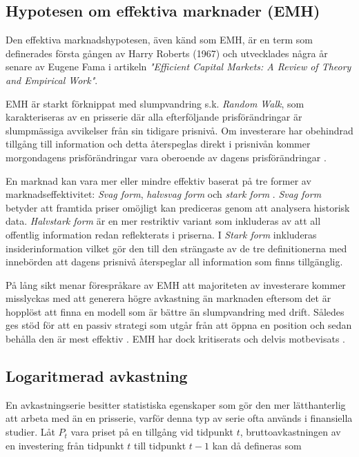 \documentclass[11pt]{article}
\numberwithin{equation}{section}
\numberwithin{table}{section}
\numberwithin{figure}{section}
\begin{document}
\subsection{Hypotesen om effektiva marknader (EMH)}
Den effektiva marknadshypotesen, även känd som EMH, är en term som definerades första gången av Harry Roberts (1967) och utvecklades några år senare av Eugene Fama \parencite*{Fama1970} i artikeln \emph{"Efficient Capital Markets: A Review of Theory and Empirical Work"}. 

EMH är starkt förknippat med slumpvandring s.k. \emph{Random Walk}, som karakteriseras av en prisserie där alla efterföljande prisförändringar är slumpmässiga avvikelser från sin tidigare prisnivå. Om investerare har obehindrad tillgång till information och detta återspeglas direkt i prisnivån kommer morgondagens prisförändringar vara oberoende av dagens prisförändringar \parencite{EMH}. 

En marknad kan vara mer eller mindre effektiv baserat på tre former av marknadseffektivitet: \emph{Svag form}, \emph{halvsvag form} och \emph{stark form} \parencite{Fama1970}. \emph{Svag form} betyder att framtida priser omöjligt kan prediceras genom att analysera historisk data. \emph{Halvstark form} är en mer restriktiv variant som inkluderas av att all offentlig information redan reflekterats i priserna. I \emph{Stark form} inkluderas insiderinformation vilket gör den till den strängaste av de tre definitionerna med innebörden att dagens prisnivå återspeglar all information som finns tillgänglig.

På lång sikt menar förespråkare av EMH att majoriteten av investerare kommer misslyckas med att generera högre avkastning än marknaden eftersom det är hopplöst att finna en modell som är bättre än slumpvandring med drift. Således ges stöd för att en passiv strategi som utgår från att öppna en position och sedan behålla den är mest effektiv \parencite{EMHforecast}. EMH har dock kritiserats och delvis motbevisats \parencite{basu1977investment, ball1978anomalies}.

\subsection{Logaritmerad avkastning}

En avkastningserie besitter statistiska egenskaper som gör den mer lätthanterlig att arbeta med än en prisserie, varför denna typ av serie ofta används i finansiella studier. Låt $P_{t}$ vara priset på en tillgång vid tidpunkt $t$, bruttoavkastningen av en investering från tidpunkt $t$ till tidpunkt $t-1$ kan då defineras som
\end{document}
